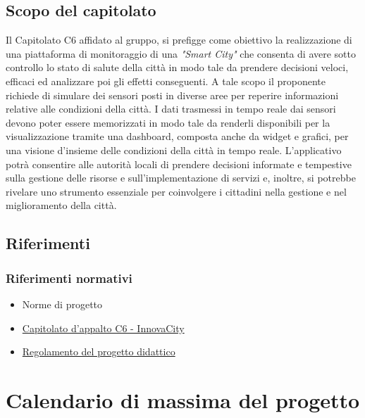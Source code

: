 \documentclass{article}
\begin{document}
\subsection{Scopo del capitolato}
Il Capitolato C6 affidato al gruppo, si prefigge come obiettivo la realizzazione di una piattaforma di monitoraggio di una \textit{"Smart City"} che consenta di avere sotto controllo lo stato di salute della città in modo tale da prendere decisioni veloci, efficaci ed analizzare poi gli effetti conseguenti.
A tale scopo il proponente richiede di simulare dei sensori posti in diverse aree per reperire informazioni relative alle condizioni della città.
I dati trasmessi in tempo reale dai sensori devono poter essere memorizzati in modo tale da renderli disponibili per la visualizzazione tramite una dashboard, composta anche da widget e grafici, per una visione d'insieme delle condizioni della città in tempo reale.
L'applicativo potrà consentire alle autorità locali di prendere decisioni informate e tempestive sulla gestione delle risorse e sull'implementazione di servizi e, inoltre, si potrebbe rivelare uno strumento essenziale per coinvolgere i cittadini nella gestione e nel miglioramento della città.

\subsection{Riferimenti}
\subsubsection{Riferimenti normativi}
\begin{itemize}
    \item Norme di progetto
    \item \href {https://www.math.unipd.it/~tullio/IS-1/2023/Progetto/C6.pdf} {Capitolato d'appalto C6 - InnovaCity}
    \item \href {https://www.math.unipd.it/~tullio/IS-1/2023/Dispense/PD2.pdf} {Regolamento del progetto didattico}
\end{itemize}

\section{Calendario di massima del progetto}
\end{document}
